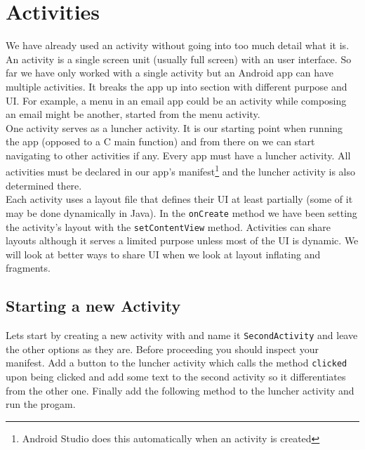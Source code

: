 \graphicspath{{./lab03/Images/}}


\maketocpage


\section{Activities}
We have already used an activity without going into too much detail what it is. An activity is a single screen unit (usually full screen) with an user interface. So far we have only worked with a single activity but an Android app can have multiple activities. It breaks the app up into section with different purpose and UI. For example, a menu in an email app could be an activity while composing an email might be another, started from the menu activity.\\

One activity serves as a luncher activity. It is our starting point when running the app (opposed to a C main function) and from there on we can start navigating to other activities if any. Every app must have a luncher activity. All activities must be declared in our app's manifest\footnote{Android Studio does this automatically when an activity is created} and the luncher activity is also determined there.\\

Each activity uses a layout file that defines their UI at least partially (some of it may be done dynamically in Java). In the \texttt{onCreate} method we have been setting the activity's layout with the \texttt{setContentView} method. Activities can share layouts although it serves a limited purpose unless most of the UI is dynamic. We will look at better ways to share UI when we look at layout inflating and fragments.\\

\subsection{Starting a new Activity}
Lets start by creating a new activity with  and name it \texttt{SecondActivity} and leave the other options as they are. Before proceeding you should inspect your manifest. Add a button to the luncher activity which calls the method \texttt{clicked} upon being clicked and add some text to the second activity so it differentiates from the other one. Finally add the following method to the luncher activity and run the progam.

